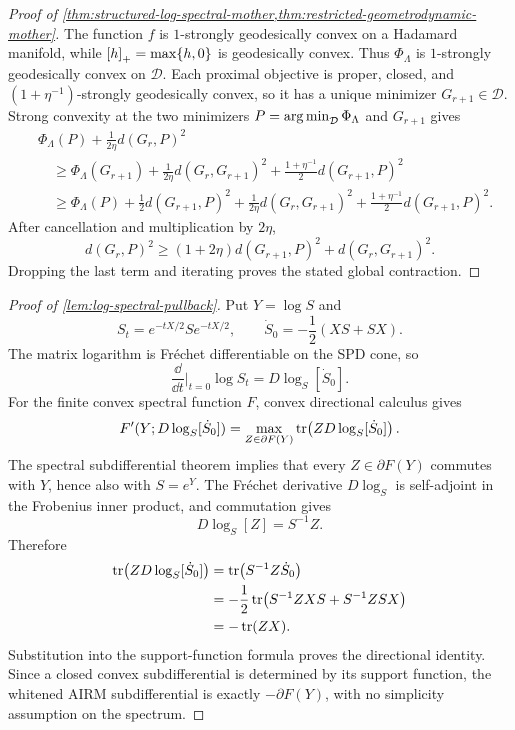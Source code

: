 \begin{proof}[Proof of
\cref{thm:structured-log-spectral-mother,thm:restricted-geometrodynamic-mother}]
The function \(f\) is \(1\)-strongly geodesically convex on a Hadamard
manifold, while \(\left[h\right]_+=\max\{h,0\}\) is geodesically convex. Thus
\(\Phi_\Lambda\) is \(1\)-strongly geodesically convex on \(\mathcal D\).
Each proximal objective is proper, closed, and
\((1+\eta^{-1})\)-strongly geodesically convex, so it has a unique minimizer
\(G_{r+1}\in\mathcal D\). Strong convexity at the two minimizers
\(P=\operatorname*{arg\,min}_{\mathcal D}\Phi_\Lambda\) and \(G_{r+1}\) gives
\[
\begin{aligned}
  &\Phi_\Lambda(P)+\frac{1}{2\eta}d(G_r,P)^2\\
  &\quad\ge
  \Phi_\Lambda(G_{r+1})
  +\frac{1}{2\eta}d(G_r,G_{r+1})^2
  +\frac{1+\eta^{-1}}{2}d(G_{r+1},P)^2\\
  &\quad\ge
  \Phi_\Lambda(P)
  +\frac12d(G_{r+1},P)^2
  +\frac{1}{2\eta}d(G_r,G_{r+1})^2
  +\frac{1+\eta^{-1}}{2}d(G_{r+1},P)^2.
\end{aligned}
\]
After cancellation and multiplication by \(2\eta\),
\[
  d(G_r,P)^2
  \ge
  (1+2\eta)d(G_{r+1},P)^2+d(G_r,G_{r+1})^2.
\]
Dropping the last term and iterating proves the stated global contraction.
\end{proof}

\begin{proof}[Proof of \cref{lem:log-spectral-pullback}]
Put \(Y=\log S\) and
\[
  S_t=e^{-tX/2}Se^{-tX/2},
  \qquad
  \dot S_0=-\frac12(XS+SX).
\]
The matrix logarithm is Fr\'echet differentiable on the SPD cone, so
\[
  \frac{\dd}{\dd t}\bigg|_{t=0}\log S_t
  =D\log_S[\dot S_0].
\]
For the finite convex spectral function \(F\), convex directional calculus
gives
\[
  F'(Y;D\log_S[\dot S_0])
  =
  \max_{Z\in\partial F(Y)}
  \operatorname{tr}\!\left(ZD\log_S[\dot S_0]\right).
\]
The spectral subdifferential theorem \cite{lewis1996convex} implies that every
\(Z\in\partial F(Y)\) commutes with \(Y\), hence also with \(S=e^Y\).
The Fr\'echet derivative \(D\log_S\) is self-adjoint in the Frobenius inner
product, and commutation gives
\[
  D\log_S[Z]=S^{-1}Z.
\]
Therefore
\[
\begin{aligned}
  \operatorname{tr}\!\left(ZD\log_S[\dot S_0]\right)
  &=\operatorname{tr}\!\left(S^{-1}Z\dot S_0\right)\\
  &=-\frac12\operatorname{tr}\!\left(S^{-1}ZXS+S^{-1}ZSX\right)\\
  &=-\operatorname{tr}(ZX).
\end{aligned}
\]
Substitution into the support-function formula proves the directional identity.
Since a closed convex subdifferential is determined by its support function,
the whitened AIRM subdifferential is exactly \(-\partial F(Y)\), with no
simplicity assumption on the spectrum.
\end{proof}

